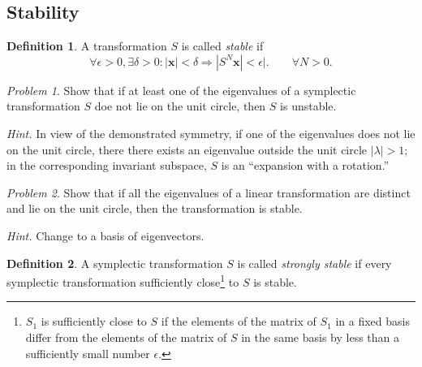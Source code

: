 \documentclass[leqno]{book}
\numberwithin{equation}{section}
\theoremstyle{plain}
\theoremstyle{definition}
\newtheorem*{defn*}{Definition}
\theoremstyle{remark}
\theoremstyle{smallcap}
\newtheorem*{prob*}{Problem}
\numberwithin{prob}{section}
\newcommand{\hint}[1]{\textit{Hint.} #1}
\begin{document}
\setcounter{subsection}{2}
\subsection{Stability}

\begin{defn*}
  A transformation $S$ is called \emph{stable} if
  $$
  \forall \epsilon > 0,
  \exists \delta > 0:
  |\mathbf x| < \delta
  \Longrightarrow
  |S^N \mathbf x| < \epsilon|.
  \qquad
  \forall N > 0.
  $$
\end{defn*}

\begin{prob*}
  Show that if at least one of the eigenvalues of
  a symplectic transformation $S$ doe not lie on the unit circle,
  then $S$ is unstable.

  \hint{
    In view of the demonstrated symmetry, if one of the eigenvalues
    does not lie on the unit circle, there there exists an eigenvalue
    outside the unit circle $|\lambda| > 1$;
    in the corresponding invariant subspace,
    $S$ is an ``expansion with a rotation.''
  }
\end{prob*}

\begin{prob*}
  Show that if all the eigenvalues of a linear transformation
  are distinct and lie on the unit circle, then the transformation is stable.

  \hint{
    Change to a basis of eigenvectors.
  }

\end{prob*}

\begin{defn*}
  A symplectic transformation $S$ is called \emph{strongly stable}
  if every symplectic transformation sufficiently close\footnote{
    $S_1$ is sufficiently close to $S$ if the elements of
    the matrix of $S_1$ in a fixed basis differ from the
    elements of the matrix of $S$ in the same basis by less than a
    sufficiently small number $\epsilon$.
  }
  to $S$ is stable.
\end{defn*}
\end{document}
